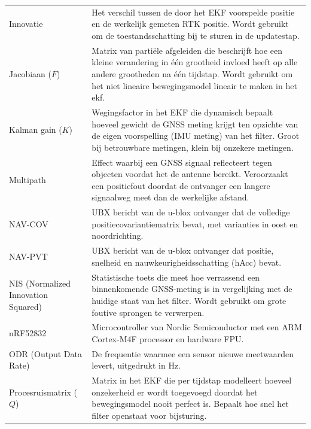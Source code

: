 \begin{longtable}{p{4.5cm} p{10cm}}
    Innovatie &
    Het verschil tussen de door het EKF voorspelde positie en de
    werkelijk gemeten RTK positie. Wordt gebruikt om de
    toestandsschatting bij te sturen in de updatestap. \\

    Jacobiaan ($F$) &
    Matrix van partiële afgeleiden die beschrijft hoe een kleine
    verandering in één grootheid invloed heeft op alle andere
    grootheden na één tijdstap. Wordt gebruikt om het
    niet lineaire bewegingsmodel lineair te maken in het ekf. \\

    Kalman gain ($K$) &
    Wegingsfactor in het EKF die dynamisch bepaalt hoeveel gewicht
    de GNSS meting krijgt ten opzichte van de eigen voorspelling (IMU meting)
    van het filter. Groot bij betrouwbare metingen, klein bij
    onzekere metingen. \\

    Multipath &
    Effect waarbij een GNSS signaal reflecteert tegen
    objecten voordat het de antenne bereikt. Veroorzaakt een
    positiefout doordat de ontvanger een langere signaalweg meet
    dan de werkelijke afstand. \\

    NAV-COV &
    UBX bericht van de u-blox ontvanger dat de volledige
    positiecovariantiematrix bevat, met varianties in oost en
    noordrichting. \\

    NAV-PVT &
    UBX bericht van de u-blox ontvanger dat positie, snelheid
    en nauwkeurigheidsschatting (hAcc) bevat. \\

    NIS (Normalized Innovation Squared) &
    Statistische toets die meet hoe verrassend een binnenkomende
    GNSS-meting is in vergelijking met de huidige staat van het filter. Wordt gebruikt
    om grote foutive sprongen te verwerpen. \\

    nRF52832 &
    Microcontroller van Nordic Semiconductor met een ARM
    Cortex-M4F processor en hardware FPU. \\

    ODR (Output Data Rate) &
    De frequentie waarmee een sensor nieuwe meetwaarden levert,
    uitgedrukt in Hz. \\

    Procesruismatrix ($Q$) &
    Matrix in het EKF die per tijdstap modelleert hoeveel
    onzekerheid er wordt toegevoegd doordat het bewegingsmodel
    nooit perfect is. Bepaalt hoe snel het filter openstaat
    voor bijsturing. \\


\end{longtable}
